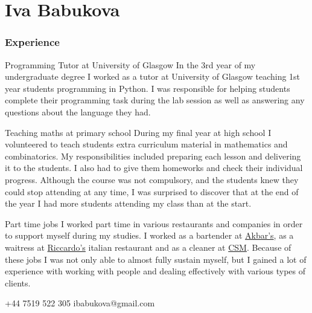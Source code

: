 \documentclass{tccv}
\begin{document}
\setlength{\emergencystretch}{3em}
\part{Iva Babukova}

\section{\LARGE Experience \normalsize}

\begin{skillist}

\item{Programming Tutor at University of Glasgow} {In the 3rd year of my undergraduate degree I worked as a tutor at University of Glasgow teaching 1st year students programming in Python. I was responsible for helping students complete their programming task during the lab session as well as answering any questions about the language they had.}

\item{Teaching maths at primary school} {During my final year at high school I volunteered to teach students extra curriculum material in mathematics and combinatorics. My responsibilities included preparing each lesson and delivering it to the students. I also had to give them homeworks and check their individual progress. Although the course was not compulsory, and the students knew they could stop attending at any time, I was surprised to discover that at the end of the year I had more students attending my class than at the start.}

\item{Part time jobs} {I worked part time in various restaurants and companies in order to support myself during my studies. I worked as a bartender at \href{http://www.akbars.co.uk/glasgow}{Akbar's}, as a waitress at \href{http://www.tripadvisor.co.uk/Restaurant_Review-g186534-d4087172-Reviews-Riccardo_s_Italian_Kitchen-Glasgow_Scotland.html}{Riccardo's} italian restaurant and as a cleaner at \href{http://www.csmfacilities.co.uk/cleaning-company-glasgow/}{CSM}. Because of these jobs I was not only able to almost fully sustain myself, but I gained a lot of experience with working with people and dealing effectively with various types of clients.}

\end{skillist}

    {+44 7519 522 305}
    {ibabukova@gmail.com}
\end{document}
